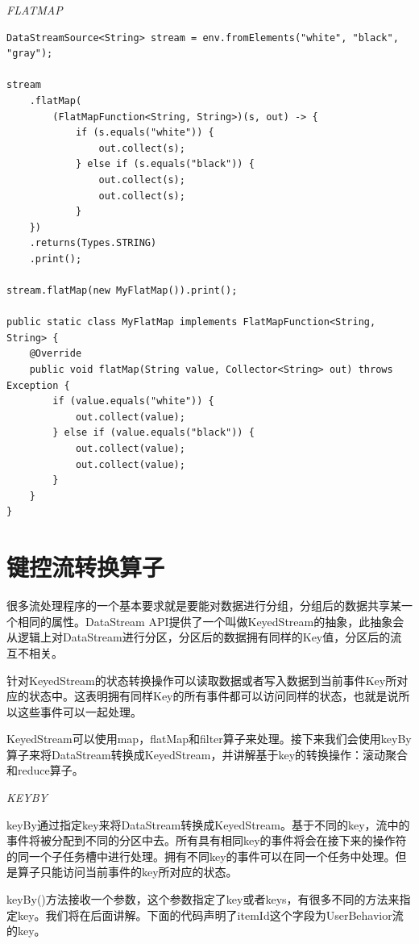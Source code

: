 \documentclass[cn,11pt,chinese]{elegantbook}
\begin{document}
\textit{FLATMAP}

\begin{verbatim}
DataStreamSource<String> stream = env.fromElements("white", "black", "gray");

stream
    .flatMap(
        (FlatMapFunction<String, String>)(s, out) -> {
            if (s.equals("white")) {
                out.collect(s);
            } else if (s.equals("black")) {
                out.collect(s);
                out.collect(s);
            }
    })
    .returns(Types.STRING)
    .print();
    
stream.flatMap(new MyFlatMap()).print();

public static class MyFlatMap implements FlatMapFunction<String, String> {
    @Override
    public void flatMap(String value, Collector<String> out) throws Exception {
        if (value.equals("white")) {
            out.collect(value);
        } else if (value.equals("black")) {
            out.collect(value);
            out.collect(value);
        }
    }
}
\end{verbatim}

\section{键控流转换算子}

很多流处理程序的一个基本要求就是要能对数据进行分组，分组后的数据共享某一个相同的属性。DataStream API提供了一个叫做KeyedStream的抽象，此抽象会从逻辑上对DataStream进行分区，分区后的数据拥有同样的Key值，分区后的流互不相关。

针对KeyedStream的状态转换操作可以读取数据或者写入数据到当前事件Key所对应的状态中。这表明拥有同样Key的所有事件都可以访问同样的状态，也就是说所以这些事件可以一起处理。

KeyedStream可以使用map，flatMap和filter算子来处理。接下来我们会使用keyBy算子来将DataStream转换成KeyedStream，并讲解基于key的转换操作：滚动聚合和reduce算子。

\textit{KEYBY}

keyBy通过指定key来将DataStream转换成KeyedStream。基于不同的key，流中的事件将被分配到不同的分区中去。所有具有相同key的事件将会在接下来的操作符的同一个子任务槽中进行处理。拥有不同key的事件可以在同一个任务中处理。但是算子只能访问当前事件的key所对应的状态。

keyBy()方法接收一个参数，这个参数指定了key或者keys，有很多不同的方法来指定key。我们将在后面讲解。下面的代码声明了itemId这个字段为UserBehavior流的key。
\end{document}
